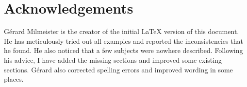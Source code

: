\documentclass[12pt]{article}
\begin{document}
\section{Acknowledgements}
G\'{e}rard Milmeister is the creator of the initial LaTeX version of this document. He has meticulously tried out all examples and reported the inconsistencies that he found. He also noticed that a few subjects were nowhere described. Following his advice, I have added the missing sections and improved some existing sections. Gérard also corrected spelling errors and improved wording in some places. 

\printindex
\end{document}
